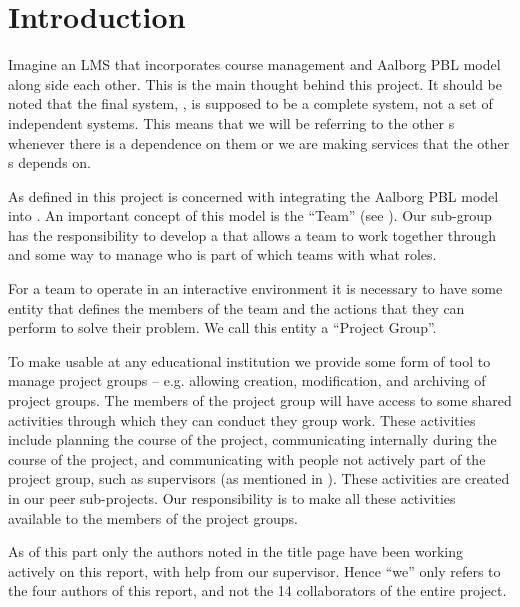 \chapter{Introduction}
\label{chap:introProjectgroup}
Imagine an LMS that incorporates course management and Aalborg PBL model along side each other.
This is the main thought behind this project.
It should be noted that the final system, \system{}, is supposed to be a complete system, not a set of independent systems.
This means that we will be referring to the other \subsystem{}s whenever there is a dependence on them or we are making services that the other \subsystem{}s depends on.



As defined in  this project is concerned with integrating the Aalborg PBL model into \moodle.
An important concept of this model is the ``Team'' (see ).
Our sub-group has the responsibility to develop a \subsystem{} that allows a team to work together through \moodle{} and some way to manage who is part of which teams with what roles.



For a team to operate in an interactive environment it is necessary to have some entity that defines the members of the team and the actions that they can perform to solve their problem.
We call this entity a ``Project Group''.



To make \system{} usable at any educational institution we provide some form of tool to manage project groups -- e.g. allowing  creation, modification, and archiving of project groups.
The members of the project group will have access to some shared activities through which they can conduct they group work.
These activities include planning the course of the project, communicating internally during the course of the project, and communicating with people not actively part of the project group, such as supervisors (as mentioned in ).
These activities are created in our peer sub-projects.
Our responsibility is to make all these activities available to the members of the project groups.



As of this part only the authors noted in the title page have been working actively on this report, with help from our supervisor.
Hence ``we'' only refers to the four authors of this report, and not the 14 collaborators of the entire project.
